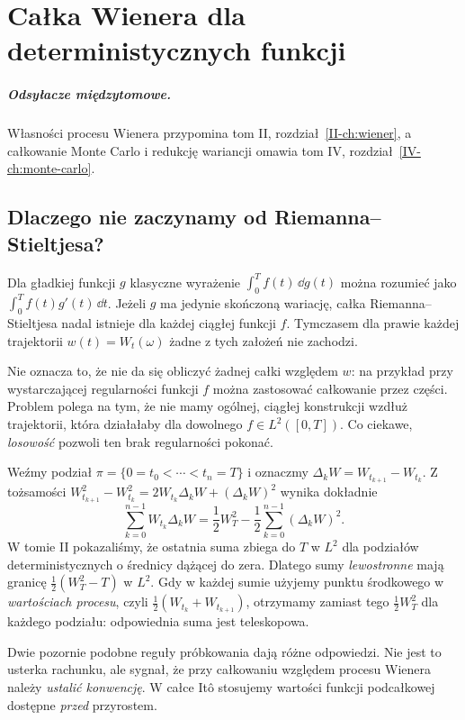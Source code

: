 \chapter{Całka Wienera dla deterministycznych funkcji}
\label{ch:wiener-integral}
\paragraph{Odsyłacze międzytomowe.} Własności procesu Wienera przypomina tom II, rozdział~\ref{II-ch:wiener}, a całkowanie Monte Carlo i redukcję wariancji omawia tom IV, rozdział~\ref{IV-ch:monte-carlo}.

\section{Dlaczego nie zaczynamy od Riemanna--Stieltjesa?}
Dla gładkiej funkcji $g$ klasyczne wyrażenie
$\int_0^T f(t)\,\dd g(t)$ można rozumieć jako
$\int_0^T f(t)g'(t)\,\dd t$. Jeżeli $g$ ma jedynie
skończoną wariację, całka Riemanna--Stieltjesa nadal istnieje
dla każdej ciągłej funkcji $f$. Tymczasem dla prawie każdej
trajektorii $w(t)=W_t(\omega)$ żadne z tych założeń nie zachodzi.

Nie oznacza to, że nie da się obliczyć żadnej całki względem $w$:
na przykład przy wystarczającej regularności funkcji $f$ można
zastosować całkowanie przez części. Problem polega na tym,
że nie mamy ogólnej, ciągłej konstrukcji wzdłuż trajektorii,
która działałaby dla dowolnego $f\in L^2([0,T])$.
Co ciekawe, \emph{losowość} pozwoli ten brak regularności pokonać.

\begin{przyklad}
Weźmy podział $\pi=\{0=t_0<\cdots<t_n=T\}$ i oznaczmy
$\Delta_kW=W_{t_{k+1}}-W_{t_k}$. Z tożsamości
$W_{t_{k+1}}^2-W_{t_k}^2=2W_{t_k}\Delta_kW+(\Delta_kW)^2$
wynika dokładnie
\[
\sum_{k=0}^{n-1}W_{t_k}\Delta_kW
=\frac12W_T^2-\frac12\sum_{k=0}^{n-1}(\Delta_kW)^2.
\]
W tomie II pokazaliśmy, że ostatnia suma zbiega do $T$ w $L^2$
dla podziałów deterministycznych o średnicy dążącej do zera.
Dlatego sumy \emph{lewostronne} mają granicę
$\frac12(W_T^2-T)$ w $L^2$. Gdy w każdej sumie użyjemy
punktu środkowego w \emph{wartościach procesu}, czyli
$\frac12(W_{t_k}+W_{t_{k+1}})$, otrzymamy zamiast tego
$\frac12W_T^2$ dla każdego podziału: odpowiednia suma
jest teleskopowa.

Dwie pozornie podobne reguły próbkowania dają różne odpowiedzi.
Nie jest to usterka rachunku, ale sygnał, że przy całkowaniu względem
procesu Wienera należy \emph{ustalić konwencję}. W całce Itô
stosujemy wartości funkcji podcałkowej dostępne \emph{przed} przyrostem.
\end{przyklad}

